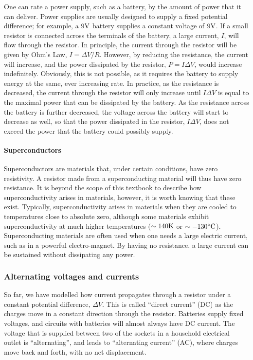 One can rate a power supply, such as a battery, by the amount of power that it can deliver. Power supplies are usually designed to supply a fixed potential difference; for example, a $9 {\rm V}$ battery supplies a constant voltage of $9 {\rm V}$. If a small resistor is connected across the terminals of the battery, a large current, $I$, will flow through the resistor. In principle, the current through the resistor will be given by Ohm's Law, $I=\Delta V/R$. However, by reducing the resistance, the current will increase, and the power dissipated by the resistor, $P=I\Delta V$, would increase indefinitely. Obviously, this is not possible, as it requires the battery to supply energy at the same, ever increasing rate. In practice, as the resistance is decreased, the current through the resistor will only increase until $I \Delta V$ is equal to the maximal power that can be dissipated by the battery. As the resistance across the battery is further decreased, the voltage across the battery will start to decrease as well, so that the power dissipated in the resistor, $I \Delta V$, does not exceed the power that the battery could possibly supply.

\paragraph{Superconductors}

Superconductors are materials that, under certain conditions, have zero resistivity. A resistor made from a superconducting material will thus have zero resistance. It is beyond the scope of this textbook to describe how superconductivity arises in materials, however, it is worth knowing that these exist. Typically, superconductivity arises in materials when they are cooled to temperatures close to absolute zero, although some materials exhibit superconductivity at much higher temperatures ($\sim140 {\rm K}$ or $\sim -130 {\rm \degree C}$). Superconducting materials are often used when one needs a large electric current, such as in a powerful electro-magnet. By having no resistance, a large current can be sustained without dissipating any power.

\subsubsection{Alternating voltages and currents}

So far, we have modelled how current propagates through a resistor under a constant potential difference, $\Delta V$. This is called ``direct current'' (DC) as the charges move in a constant direction through the resistor. Batteries supply fixed voltages, and circuits with batteries will almost always have DC current. The voltage that is supplied between two of the sockets in a household electrical outlet is ``alternating'', and leads to ``alternating current'' (AC), where charges move back and forth, with no net displacement.

